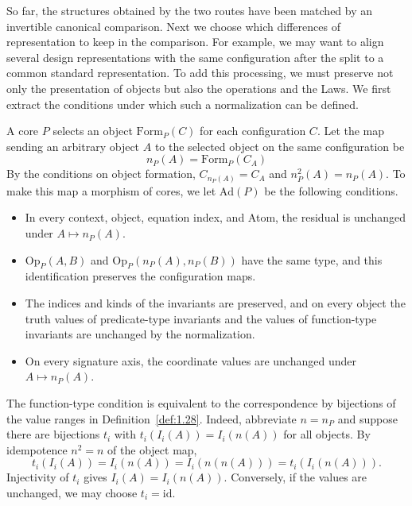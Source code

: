 So far, the structures obtained by the two routes have been matched by an invertible
canonical comparison. Next we choose which differences of representation to keep in the
comparison. For example, we may want to align several design representations with the same
configuration after the split to a common standard representation. To add this processing,
we must preserve not only the presentation of objects but also the operations and the
Laws. We first extract the conditions under which such a normalization can be defined.

\begin{definition}\label{def:5.39}

A core $P$ selects an object $\mathrm{Form}_P(C)$ for each configuration $C$. Let the map
sending an arbitrary object $A$ to the selected object on the same configuration be
\begin{equation*}
n_P(A)=\mathrm{Form}_P(C_A)
\tag{5.45}\label{eq:5.45}
\end{equation*}
By the conditions on object formation, $C_{n_P(A)}=C_A$ and $n_P^2(A)=n_P(A)$. To make
this map a morphism of cores, we let $\mathrm{Ad}(P)$ be the following conditions.

\begin{itemize}
\item In every context, object, equation index, and Atom, the residual is unchanged under
$A\mapsto n_P(A)$.
\item $\mathrm{Op}_P(A,B)$ and $\mathrm{Op}_P(n_P(A),n_P(B))$ have the same type, and this
identification preserves the configuration maps.
\item The indices and kinds of the invariants are preserved, and on every object the truth
values of predicate-type invariants and the values of function-type invariants are
unchanged by the normalization.
\item On every signature axis, the coordinate values are unchanged under
$A\mapsto n_P(A)$.
\end{itemize}

The function-type condition is equivalent to the correspondence by bijections of the value
ranges in Definition~\ref{def:1.28}. Indeed, abbreviate $n=n_P$ and suppose there are
bijections $t_i$ with $t_i(I_i(A))=I_i(n(A))$ for all objects. By idempotence $n^2=n$ of
the object map,
\[
t_i(I_i(A))=I_i(n(A))=I_i(n(n(A)))=t_i(I_i(n(A))).
\]
Injectivity of $t_i$ gives $I_i(A)=I_i(n(A))$. Conversely, if the values are unchanged, we
may choose $t_i=\mathrm{id}$.


\end{definition}
